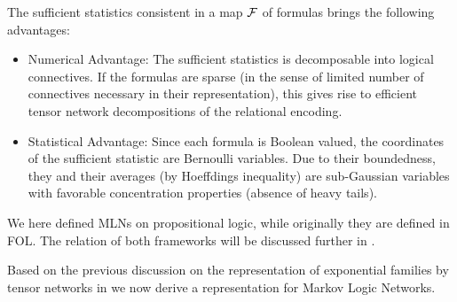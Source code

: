 

The sufficient statistics consistent in a map $\mathcal{F}$ of formulas brings the following advantages:
\begin{itemize}
	\item Numerical Advantage: The sufficient statistics is decomposable into logical connectives. 
	If the formulas are sparse (in the sense of limited number of connectives necessary in their representation), this gives rise to efficient tensor network decompositions of the relational encoding.
	\item Statistical Advantage: Since each formula is Boolean valued, the coordinates of the sufficient statistic are Bernoulli variables. 
	Due to their boundedness, they and their averages (by Hoeffdings inequality) are sub-Gaussian variables with favorable concentration properties (absence of heavy tails).
\end{itemize}


\begin{remark}
	We here defined MLNs on propositional logic, while originally they are defined in FOL.
	The relation of both frameworks will be discussed further in .
\end{remark}




Based on the previous discussion on the representation of exponential families by tensor networks in  we now derive a representation for Markov Logic Networks.


